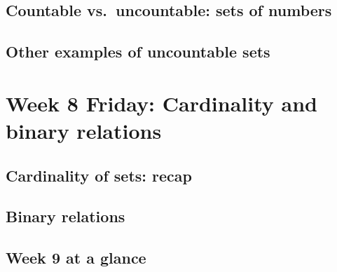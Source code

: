 \subsection*{Countable vs.\ uncountable: sets of numbers}

\subsection*{Other examples of uncountable sets}


\newpage
\section*{Week 8 Friday: Cardinality and binary relations}

\subsection*{Cardinality of sets: recap}

\newpage

\newpage

\newpage
\subsection*{Binary relations}

\vfill

\vfill
\newpage


\newpage

\subsection*{Week 9 at a glance}

